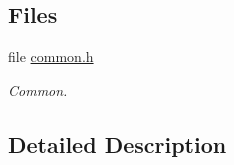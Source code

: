 \subsection*{Files}
\begin{DoxyCompactItemize}
\item 
file \hyperlink{common_8h}{common.\+h}
\begin{DoxyCompactList}\small\item\em Common. \end{DoxyCompactList}\end{DoxyCompactItemize}


\subsection{Detailed Description}

